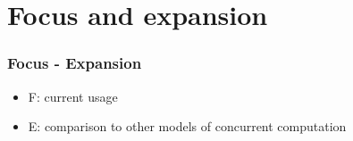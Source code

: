 \section{Focus and expansion}
\begin{frame}
\frametitle{Focus - Expansion}
\begin{itemize}
\item F: current usage
\item E: comparison to other models of concurrent computation
\end{itemize}
\end{frame}